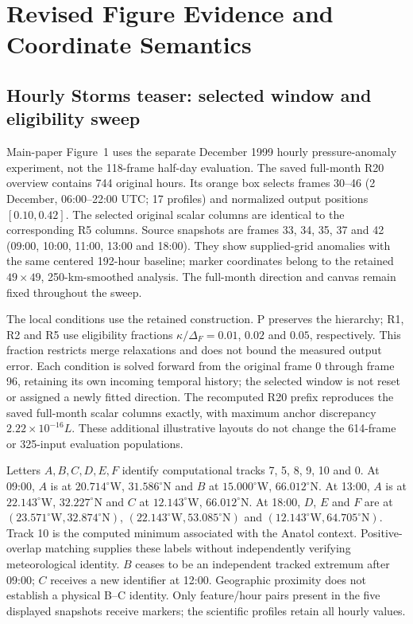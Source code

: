 \section{Revised Figure Evidence and Coordinate Semantics}\label{sec:revision_figures}
\subsection{Hourly Storms teaser: selected window and eligibility sweep}\label{sec:s_hourly_teaser}
Main-paper Figure~1 uses the separate December 1999 hourly pressure-anomaly experiment, not the 118-frame half-day evaluation. The saved full-month R20 overview contains 744 original hours. Its orange box selects frames 30--46 (2 December, 06:00--22:00 UTC; 17 profiles) and normalized output positions $[0.10,0.42]$. The selected original scalar columns are identical to the corresponding R5 columns. Source snapshots are frames 33, 34, 35, 37 and 42 (09:00, 10:00, 11:00, 13:00 and 18:00). They show supplied-grid anomalies with the same centered 192-hour baseline; marker coordinates belong to the retained $49\times49$, 250-km-smoothed analysis. The full-month direction and canvas remain fixed throughout the sweep.

The local conditions use the retained construction. P preserves the hierarchy; R1, R2 and R5 use eligibility fractions $\kappa/\Delta_F=0.01$, $0.02$ and $0.05$, respectively. This fraction restricts merge relaxations and does not bound the measured output error. Each condition is solved forward from the original frame 0 through frame 96, retaining its own incoming temporal history; the selected window is not reset or assigned a newly fitted direction. The recomputed R20 prefix reproduces the saved full-month scalar columns exactly, with maximum anchor discrepancy $2.22\times10^{-16}L$. These additional illustrative layouts do not change the 614-frame or 325-input evaluation populations.

Letters $A,B,C,D,E,F$ identify computational tracks 7, 5, 8, 9, 10 and 0. At 09:00, $A$ is at $20.714^\circ$W, $31.586^\circ$N and $B$ at $15.000^\circ$W, $66.012^\circ$N. At 13:00, $A$ is at $22.143^\circ$W, $32.227^\circ$N and $C$ at $12.143^\circ$W, $66.012^\circ$N. At 18:00, $D$, $E$ and $F$ are at $(23.571^\circ\mathrm{W},32.874^\circ\mathrm{N})$, $(22.143^\circ\mathrm{W},53.085^\circ\mathrm{N})$ and $(12.143^\circ\mathrm{W},64.705^\circ\mathrm{N})$. Track 10 is the computed minimum associated with the Anatol context. Positive-overlap matching supplies these labels without independently verifying meteorological identity. $B$ ceases to be an independent tracked extremum after 09:00; $C$ receives a new identifier at 12:00. Geographic proximity does not establish a physical B--C identity. Only feature/hour pairs present in the five displayed snapshots receive markers; the scientific profiles retain all hourly values.

